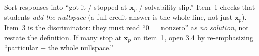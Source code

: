 \documentclass[10pt]{article}
\newcommand{\xx}{\mathbf{x}}
\begin{document}
\begin{teachernote}
Sort responses into ``got it / stopped at $\xx_p$ / solvability slip.'' Item~1 checks that students
\emph{add the nullspace} (a full-credit answer is the whole line, not just $\xx_p$). Item~3 is the
discriminator: they must read ``$0=$ nonzero'' as \emph{no solution}, not restate the definition. If many
stop at $\xx_p$ on item~1, open 3.4 by re-emphasizing ``particular $+$ the whole nullspace.''
\end{teachernote}
\end{document}
